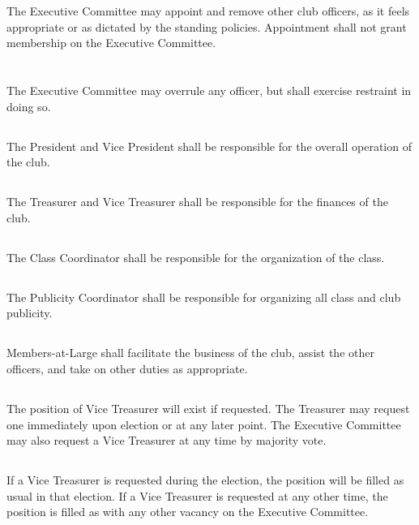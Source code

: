 \documentclass{bylaws}
\begin{document}
\section{}The Executive Committee may appoint and remove other club officers, as it feels appropriate or as dictated by the standing policies. Appointment shall not grant membership on the Executive Committee.
\section{}The Executive Committee may overrule any officer, but shall exercise restraint in doing so.

\subsection{}The President and Vice President shall be responsible for the overall operation of the club.
\subsection{}The Treasurer and Vice Treasurer shall be responsible for the finances of the club.
\subsection{}The Class Coordinator shall be responsible for the organization of the class.
\subsection{}The Publicity Coordinator shall be responsible for organizing all class and club publicity.
\subsection{}Members-at-Large shall facilitate the business of the club, assist the other officers, and take on other duties as appropriate.

\subsection{}The position of Vice Treasurer will exist if requested. The Treasurer may request one immediately upon election or at any later point. The Executive Committee may also request a Vice Treasurer at any time by majority vote.
\subsection{}If a Vice Treasurer is requested during the election, the position will be filled as usual in that election. If a Vice Treasurer is requested at any other time, the position is filled as with any other vacancy on the Executive Committee.
\end{document}
